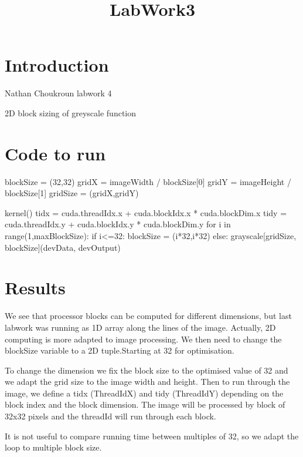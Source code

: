 \documentclass{article}
\begin{document}
\title{LabWork3}
\section{Introduction}

Nathan Choukroun labwork 4

2D block sizing of greyscale function

\section{Code to run}


blockSize = (32,32)
gridX = imageWidth / blockSize[0]
gridY = imageHeight / blockSize[1]
gridSize = (gridX,gridY)

kernel(){
    tidx = cuda.threadIdx.x + cuda.blockIdx.x * cuda.blockDim.x
    tidy = cuda.threadIdx.y + cuda.blockIdx.y * cuda.blockDim.y 
}
for i in range(1,maxBlockSize):
  if i<=32:
    blockSize = (i*32,i*32)
  else:
    grayscale[gridSize, blockSize](devData, devOutput)


\section{Results}

We see that processor blocks can be computed for different dimensions, but last labwork was running as 1D array along the lines of the image. Actually, 2D computing is more adapted to image processing. We then need to change the blockSize variable to a 2D tuple.Starting at 32 for optimisation. 

To change the dimension we fix the block size to the optimised value of 32 and we adapt the grid size to the image width and height. Then to run through the image, we define a tidx (ThreadIdX) and tidy (ThreadIdY) depending on the block index and the block dimension. The image will be processed by block of 32x32 pixels and the threadId will run through each block. 

It is not useful to compare running time between multiples of 32, so we adapt the loop to multiple block size.  
\end{document}
